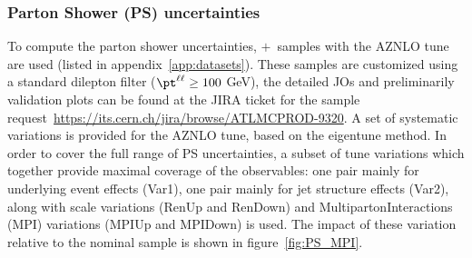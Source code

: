 \subsubsection{Parton Shower (PS) uncertainties}
To compute the parton shower uncertainties, \powheg$+$\pythia~samples with the AZNLO tune are used (listed in appendix~\ref{app:datasets}). These samples are customized using a standard dilepton \pt filter ($\pt^{\ell\ell}\geq100$ GeV), the detailed JOs and preliminarily validation plots can be found at the JIRA ticket for the sample request~\url{https://its.cern.ch/jira/browse/ATLMCPROD-9320}. A set of systematic variations is provided for the AZNLO tune, based on the eigentune method. In order to cover the full range of PS uncertainties, a subset of tune variations which together provide maximal coverage of the observables: one pair mainly for underlying event effects (Var1), one pair mainly for jet structure effects (Var2), along with scale variations (RenUp and RenDown) and MultipartonInteractions (MPI) variations (MPIUp and MPIDown) is used. The impact of these variation relative to the nominal sample is shown in figure~\ref{fig:PS_MPI}.

